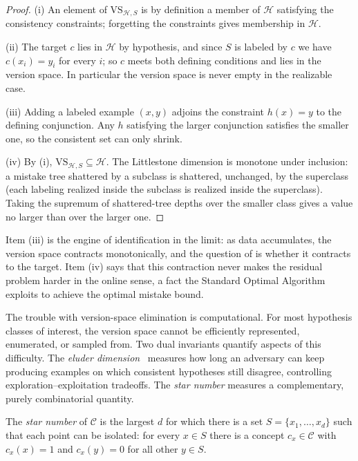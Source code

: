 \begin{proof}
(i) An element of $\mathrm{VS}_{\mathcal{H},S}$ is by definition a member of $\mathcal{H}$ satisfying the consistency constraints; forgetting the constraints gives membership in $\mathcal{H}$.

(ii) The target $c$ lies in $\mathcal{H}$ by hypothesis, and since $S$ is labeled by $c$ we have $c(x_i) = y_i$ for every $i$; so $c$ meets both defining conditions and lies in the version space. In particular the version space is never empty in the realizable case.

(iii) Adding a labeled example $(x,y)$ adjoins the constraint $h(x) = y$ to the defining conjunction. Any $h$ satisfying the larger conjunction satisfies the smaller one, so the consistent set can only shrink.

(iv) By (i), $\mathrm{VS}_{\mathcal{H},S} \subseteq \mathcal{H}$. The Littlestone dimension is monotone under inclusion: a mistake tree shattered by a subclass is shattered, unchanged, by the superclass (each labeling realized inside the subclass is realized inside the superclass). Taking the supremum of shattered-tree depths over the smaller class gives a value no larger than over the larger one.
\end{proof}

Item (iii) is the engine of identification in the limit: as data accumulates, the version space contracts monotonically, and the question of  is whether it contracts to the target. Item (iv) says that this contraction never makes the residual problem harder in the online sense, a fact the Standard Optimal Algorithm exploits to achieve the optimal mistake bound.

The trouble with version-space elimination is computational. For most hypothesis classes of interest, the version space cannot be efficiently represented, enumerated, or sampled from. Two dual invariants quantify aspects of this difficulty. The \emph{eluder dimension}~\cite{RussoVanRoy2013} measures how long an adversary can keep producing examples on which consistent hypotheses still disagree, controlling exploration--exploitation tradeoffs. The \emph{star number} measures a complementary, purely combinatorial quantity.

\begin{defn}
\label{def:star-number}
The \emph{star number} of $\mathcal{C}$ is the largest $d$ for which there is a set $S = \{x_1,\dots,x_d\}$ such that each point can be isolated: for every $x \in S$ there is a concept $c_x \in \mathcal{C}$ with $c_x(x) = 1$ and $c_x(y) = 0$ for all other $y \in S$.
\end{defn}

